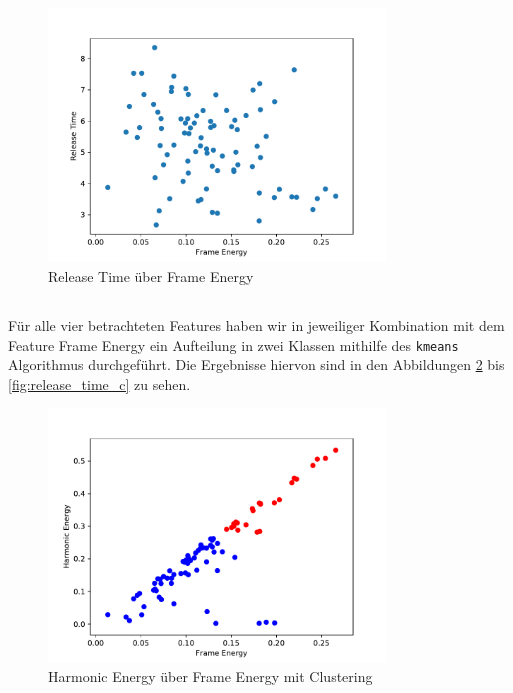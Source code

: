 \begin{figure}[H]
    \center
    \includegraphics[width = 0.8\textwidth]{Figures/rel.pdf}
    \caption{Release Time über Frame Energy}
    \label{fig:release_time}
\end{figure}

\subsection{}
Für alle vier betrachteten Features haben wir in jeweiliger Kombination mit dem Feature Frame Energy ein Aufteilung in zwei Klassen mithilfe des \texttt{kmeans} Algorithmus durchgeführt.
Die Ergebnisse hiervon sind in den Abbildungen \ref{fig:harmonic_energy_c} bis \ref{fig:release_time_c} zu sehen.

\begin{figure}[H]
    \center
    \includegraphics[width = 0.8\textwidth]{Figures/harmonic_energy_c}
    \caption{Harmonic Energy über Frame Energy mit Clustering }
    \label{fig:harmonic_energy_c}
\end{figure}


